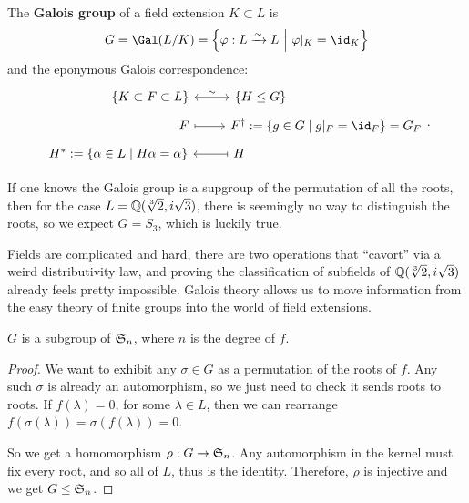 \documentclass{article}
\begin{document}
\begin{theorem}
    The \textbf{Galois group} of a field extension $K\subset L$ is \[
        G = \Gal(L/K) = \left\{\varphi:L \xrightarrow{\sim} L \ \middle| \ \varphi\vert_K = \id_K\right\}
    \] and the eponymous Galois correspondence:\[
    \begin{tikzcd}[row sep = tiny]
        \phantom{..................}\{K\subset F \subset L\} \arrow[r, leftrightarrow, "\sim"] & 
        \{H\leq G\}\phantom{.....................................}\\
        \phantom{.....................................}F \arrow[r, maps to] & 
        F^\dagger := \{g\in G \mid g\vert_F = \id_F\} = G_F\\
        H^* := \{\alpha \in L \mid H\alpha = \alpha\} & 
        H \arrow[l, maps to] \phantom{.................................................}
    \end{tikzcd}.
    \]
\end{theorem}

If one knows the Galois group is a supgroup of the permutation of all the roots, then for the case $L=\mathbb{Q}(\sqrt[3]{2},i\sqrt{3})$, there is seemingly no way to distinguish the roots, so we expect $G=S_3$, which is luckily true.

Fields are complicated and hard, there are two operations that ``cavort'' via a weird distributivity law, and proving the classification of subfields of $\mathbb{Q}(\sqrt[3]{2},i\sqrt{3})$ already feels pretty impossible. Galois theory allows us to move information from the easy theory of finite groups into the world of field extensions.

\begin{proposition}
    $G$ is a subgroup of $\mathfrak{S}_n$, where $n$ is the degree of $f$.
    \begin{proof}
        We want to exhibit any $\sigma\in G$ as a permutation of the roots of $f$.
        Any such $\sigma$ is already an automorphism, so we just need to check it sends roots to roots. If $f(\lambda)=0$, for some $\lambda \in L$, then we can rearrange $f(\sigma(\lambda)) = \sigma(f(\lambda)) = 0$.

        So we get a homomorphism $\rho : G \rightarrow \mathfrak{S}_n$. Any automorphism in the kernel must fix every root, and so all of $L$, thus is the identity. Therefore, $\rho$ is injective and we get $G\leq \mathfrak{S}_n$.
    \end{proof}
\end{proposition}
\end{document}
